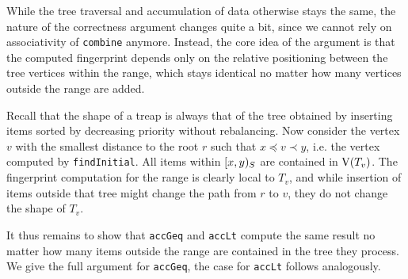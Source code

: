 While the tree traversal and accumulation of data otherwise stays the same, the nature of the correctness argument changes quite a bit, since we cannot rely on associativity of \texttt{combine} anymore. Instead, the core idea of the argument is that the computed fingerprint depends only on the relative positioning between the tree vertices within the range, which stays identical no matter how many vertices outside the range are added.

Recall that the shape of a treap is always that of the tree obtained by inserting items sorted by decreasing priority without rebalancing. Now consider the vertex $v$ with the smallest distance to the root $r$ such that $x \preceq v \prec y$, i.e. the vertex computed by \texttt{findInitial}. All items within $[{x},{y})_{S}$ are contained in $\operatorname{V}(T_v)$. The fingerprint computation for the range is clearly local to $T_v$, and while insertion of items outside that tree might change the path from $r$ to $v$, they do not change the shape of $T_v$.

It thus remains to show that \texttt{accGeq} and \texttt{accLt} compute the same result no matter how many items outside the range are contained in the tree they process. We give the full argument for \texttt{accGeq}, the case for \texttt{accLt} follows analogously.

